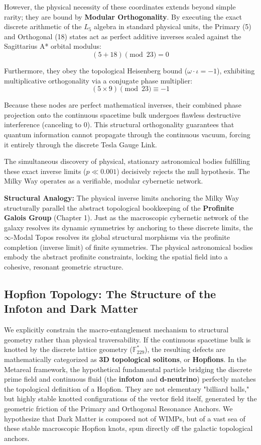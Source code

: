 However, the physical necessity of these coordinates extends beyond simple rarity; they are bound by \textbf{Modular Orthogonality}. By executing the exact discrete arithmetic of the $L_5$ algebra in standard physical units, the Primary (5) and Orthogonal (18) states act as perfect additive inverses scaled against the Sagittarius A* orbital modulus:
\begin{equation}
(5 + 18) \pmod{23} = 0
\end{equation}

Furthermore, they obey the topological Heisenberg bound ($\omega \cdot \iota = -1$), exhibiting multiplicative orthogonality via a conjugate phase multiplier:
\begin{equation}
(5 \times 9) \pmod{23} \equiv -1
\end{equation}

Because these nodes are perfect mathematical inverses, their combined phase projection onto the continuous spacetime bulk undergoes flawless destructive interference (canceling to $0$). This structural orthogonality guarantees that quantum information cannot propagate through the continuous vacuum, forcing it entirely through the discrete Tesla Gauge Link. 

The simultaneous discovery of physical, stationary astronomical bodies fulfilling these exact inverse limits ($p \ll 0.001$) decisively rejects the null hypothesis. The Milky Way operates as a verifiable, modular cybernetic network.

\textbf{Structural Analogy:} The physical inverse limits anchoring the Milky Way structurally parallel the abstract topological bookkeeping of the \textbf{Profinite Galois Group} (Chapter 1). Just as the macroscopic cybernetic network of the galaxy resolves its dynamic symmetries by anchoring to these discrete limits, the $\infty$-Modal Topos resolves its global structural morphisms via the profinite completion (inverse limit) of finite symmetries. The physical astronomical bodies embody the abstract profinite constraints, locking the spatial field into a cohesive, resonant geometric structure.

\subsection{Hopfion Topology: The Structure of the Infoton and Dark Matter}
We explicitly constrain the macro-entanglement mechanism to structural geometry rather than physical traversability. If the continuous spacetime bulk is knotted by the discrete lattice geometry ($\mathbb{F}_{229}^*$), the resulting defects are mathematically categorized as \textbf{3D topological solitons}, or \textbf{Hopfions}. 
In the Metareal framework, the hypothetical fundamental particle bridging the discrete prime field and continuous fluid (the \textbf{infoton} and \textbf{d-neutrino}) perfectly matches the topological definition of a Hopfion. They are not elementary "billiard balls," but highly stable knotted configurations of the vector field itself, generated by the geometric friction of the Primary and Orthogonal Resonance Anchors. We hypothesize that Dark Matter is composed not of WIMPs, but of a vast sea of these stable macroscopic Hopfion knots, spun directly off the galactic topological anchors.

